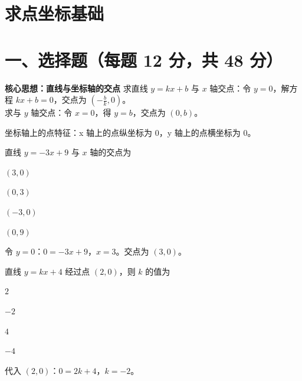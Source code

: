 \documentclass{exam-zh}
\begin{document}
\section*{求点坐标基础}

\section*{一、选择题（每题 12 分，共 48 分）}



\begin{keyideabox}
  \textbf{核心思想：直线与坐标轴的交点}
  求直线 $y=kx+b$ 与 $x$ 轴交点：令 $y=0$，解方程 $kx+b=0$，交点为 $\left(-\frac{b}{k}, 0\right)$。\\ 求与 $y$ 轴交点：令 $x=0$，得 $y=b$，交点为 $(0, b)$。
\par\small 坐标轴上的点特征：x 轴上的点纵坐标为 0，y 轴上的点横坐标为 0。\end{keyideabox}



\begin{question}[points=12]
  直线 $y = -3x + 9$ 与 $x$ 轴的交点为
  \begin{choices}
    \item $(3, 0)$
    \item $(0, 3)$
    \item $(-3, 0)$
    \item $(0, 9)$
  \end{choices}
  \paren[A]
  \begin{solutionblock}
    令 $y=0$：$0=-3x+9$，$x=3$。交点为 $(3, 0)$。
  \end{solutionblock}
\end{question}



\begin{question}[points=12]
  直线 $y = kx + 4$ 经过点 $(2, 0)$，则 $k$ 的值为
  \begin{choices}
    \item $2$
    \item $-2$
    \item $4$
    \item $-4$
  \end{choices}
  \paren[B]
  \begin{solutionblock}
    代入 $(2, 0)$：$0=2k+4$，$k=-2$。
  \end{solutionblock}
\end{question}
\end{document}
